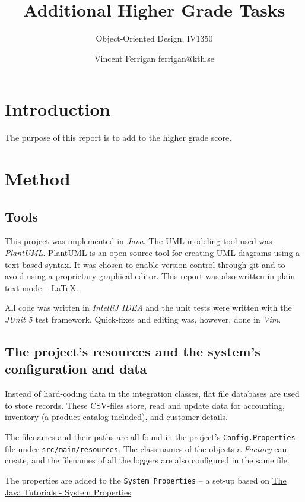 \documentclass[a4paper]{scrreprt}
\title{Additional Higher Grade Tasks}
\subtitle{Object-Oriented Design, IV1350}
\author{Vincent Ferrigan ferrigan@kth.se}
\begin{document}
\maketitle

\tableofcontents %

\chapter{Introduction}
The purpose of this report is to
add to the higher grade score.


\chapter{Method}
\section*{Tools}
This project was implemented in \emph{Java}.
The UML modeling tool used was \emph{PlantUML}.
PlantUML is an open-source tool for creating UML diagrams using a text-based
syntax.
It was chosen to enable version control through git and to avoid using a
proprietary graphical editor.
This report was also written in plain text mode -- \LaTeX.

All code was written in \emph{IntelliJ IDEA} and the unit tests were written with the \emph{JUnit 5} test framework.
Quick-fixes and editing was, however, done in \emph{Vim}.

\section*{The project's resources and the system's configuration and data}
\label{sec:resources}
Instead of hard-coding data in the integration classes,
flat file databases are used to store records.
These CSV-files store,
read and update data for accounting, inventory (a product catalog included), and customer details.

The filenames and their paths are all found in the project's \verb|Config.Properties|
file under \verb|src/main/resources|.
The class names of the objects a \emph{Factory} can create, and the filenames of all the loggers are also
configured in the same file.

The properties are added to the \verb|System Properties| -- a set-up based on
\href{https://docs.oracle.com/javase/tutorial/essential/environment/sysprop.html}{The Java\texttrademark{} Tutorials - System Properties}
\end{document}
